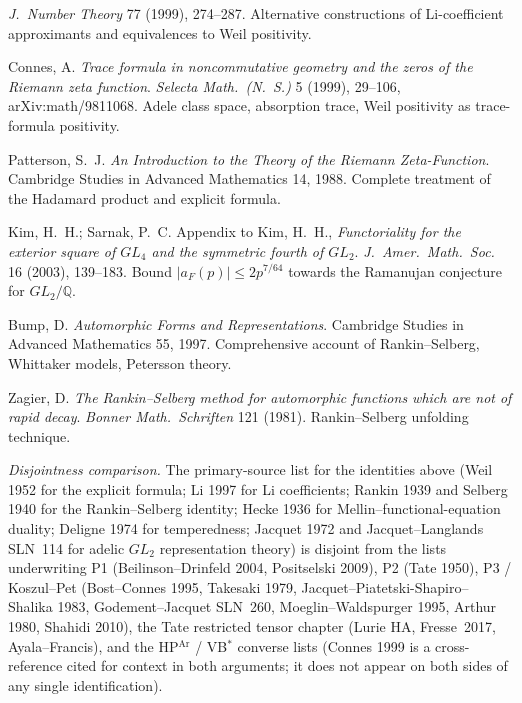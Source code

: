 \begin{description}
\emph{J.~Number Theory} 77 (1999), 274--287. Alternative constructions
of Li-coefficient approximants and equivalences to Weil positivity.
\item[Connes 1999.] Connes, A. \emph{Trace formula in noncommutative
geometry and the zeros of the Riemann zeta function}. \emph{Selecta
Math.~(N.~S.)} 5 (1999), 29--106, arXiv:math/9811068. Adele class
space, absorption trace, Weil positivity as trace-formula positivity.
\item[Patterson 1988.] Patterson, S.~J. \emph{An Introduction to the
Theory of the Riemann Zeta-Function}. Cambridge Studies in Advanced
Mathematics 14, 1988. Complete treatment of the Hadamard product
and explicit formula.
\item[Kim--Sarnak 2003.] Kim, H.~H.; Sarnak, P.~C. Appendix to
Kim, H.~H., \emph{Functoriality for the exterior square of \(GL_{4}\)
and the symmetric fourth of \(GL_{2}\)}. \emph{J.~Amer.~Math.~Soc.} 16
(2003), 139--183. Bound \(|a_{F}(p)|\leq 2p^{7/64}\) towards the
Ramanujan conjecture for \(GL_{2}/\mathbb{Q}\).
\item[Bump 1997.] Bump, D. \emph{Automorphic Forms and
Representations}. Cambridge Studies in Advanced Mathematics 55, 1997.
Comprehensive account of Rankin--Selberg, Whittaker models,
Petersson theory.
\item[Zagier 1981.] Zagier, D. \emph{The Rankin--Selberg method for
automorphic functions which are not of rapid decay}.
\emph{Bonner Math.~Schriften} 121 (1981). Rankin--Selberg unfolding
technique.
\end{description}

\noindent\emph{Disjointness comparison.} The primary-source list
for the identities above (Weil 1952 for the explicit formula; Li 1997 for
Li coefficients; Rankin 1939 and Selberg 1940 for the Rankin--Selberg
identity; Hecke 1936 for Mellin--functional-equation duality;
Deligne 1974 for temperedness; Jacquet 1972 and Jacquet--Langlands
SLN~114 for adelic \(GL_{2}\) representation theory) is disjoint from
the lists underwriting P1 (Beilinson--Drinfeld 2004, Positselski
2009), P2 (Tate 1950), P3 / Koszul--Pet (Bost--Connes 1995,
Takesaki 1979, Jacquet--Piatetski-Shapiro--Shalika 1983,
Godement--Jacquet SLN~260, Moeglin--Waldspurger 1995, Arthur 1980,
Shahidi 2010), the Tate restricted tensor chapter (Lurie HA,
Fresse~2017, Ayala--Francis), and the HP\(^{\mathrm{Ar}}\) / VB\(^{*}\)
converse lists (Connes 1999 is a cross-reference cited for
context in both arguments; it does not appear on both sides of any
single identification).
